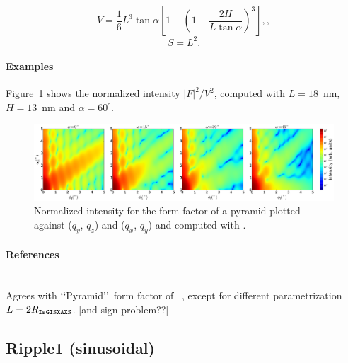 \begin{equation*}
  V = \dfrac{1}{6}  L^3 \tan\alpha\left[ 1
             - \left(1 - \dfrac{2H}{L\tan\alpha}\right)^3 \right],,
\end{equation*}
\begin{equation*}
  S = L^2.
\end{equation*}

\paragraph{Examples}
Figure~\ref{fig:FFPyramidEx} shows the normalized intensity
$|F|^2/V^2$, computed with $L=18$~nm, $H=13$~nm and
$\alpha=60^{\circ}$.

\begin{figure}[h]
\begin{center}
\includegraphics[width=\textwidth]{fig/ff2/ff_pyramid.pdf}
\end{center}
\caption{Normalized intensity for the form factor of a
  pyramid plotted against ($q_y$, $q_z$) and  
  ($q_x$, $q_y$) and computed with  .}
\label{fig:FFPyramidEx}
\end{figure}

\paragraph{References}\strut\\
Agrees with \lq\lq Pyramid\rq\rq\ form factor of \IsGISAXS~\cite{Laz02},
except for different parametrization $L=2R_{\rm{\texttt{IsGISXAXS}}}$.
[and sign problem??]

\clearpage
\subsection{Ripple1 (sinusoidal)} \label{sec:Ripple1}  

